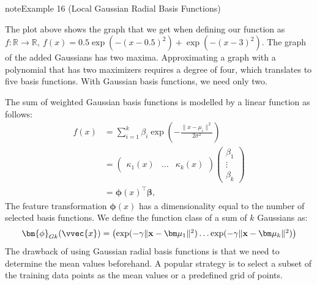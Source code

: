 \documentclass[letterpaper,10pt,english]{jupyterBook}
\begin{document}
\begin{sphinxadmonition}{note}{Example 16 (Local Gaussian Radial Basis Functions)}


\begin{center}\end{center}
\sphinxAtStartPar
The plot above shows the graph that we get when defining our function as \(f:\mathbb{R}\rightarrow\mathbb{R}, \ f(x)=0.5\exp(-(x-0.5)^2) + \exp(-(x-3)^2)\). The graph of the added Gaussians has two maxima. Approximating a graph with a polynomial that has two maximizers requires a degree of four, which translates to five basis functions. With Gaussian basis functions, we need only two.
\end{sphinxadmonition}

\sphinxAtStartPar
The sum of weighted Gaussian basis functions is modelled by a linear function as follows:
\begin{align*}
    f(x)&=\sum_{i=1}^k\beta_i\exp\left(-\frac{\lVert x-\mu_i\rVert^2}{2\sigma^2}\right)\\
    &= \begin{pmatrix}\kappa_1(x)&\ldots & \kappa_k(x)\end{pmatrix}
    \begin{pmatrix}\beta_1 \\ \vdots \\ \beta_k
    \end{pmatrix}\\
    &= \bm{\phi}(x)^\top\bm{\beta},
\end{align*}
\sphinxAtStartPar
The feature transformation \(\bm{\phi}(x)\) has a dimensionality equal to the number of selected basis functions.
We define the function class of a sum of \(k\) Gaussians as:
\begin{align*}
    \bm{\phi}_{Gk}(\vvec{x}) = \begin{pmatrix}\exp(-\gamma\lVert\mathbf{x}-\bm\mu_1\rVert^2)\ldots \exp(-\gamma\lVert\mathbf{x}-\bm\mu_k\rVert^2)\end{pmatrix} 
\end{align*}
\sphinxAtStartPar
The drawback of using Gaussian radial basis functions is that we need to determine the mean values beforehand. A popular strategy is to select a subset of the training data points as the mean values or a predefined grid of  points.
\end{document}

